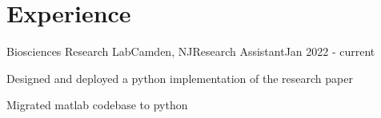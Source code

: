 \thispagestyle{empty}

\section{Experience}

\begin{role}{Biosciences Research Lab}{Camden, NJ}{Research Assistant}{Jan 2022 - current}
	\item Designed and deployed a python implementation of the research paper
  \item Migrated matlab codebase to python
\end{role}

